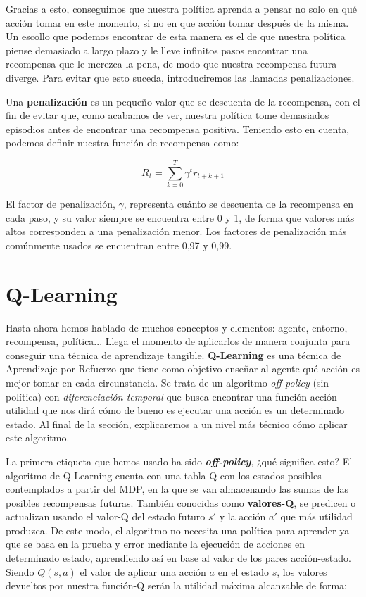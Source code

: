 Gracias a esto, conseguimos que nuestra política aprenda a pensar no solo en qué acción tomar en este momento, si no en que acción tomar después de la misma. Un escollo que podemos encontrar de esta manera es el de que nuestra política piense demasiado a largo plazo y le lleve infinitos pasos encontrar una recompensa que le merezca la pena, de modo que nuestra recompensa futura diverge. Para evitar que esto suceda, introduciremos las llamadas penalizaciones.

Una \textbf{penalización} es un pequeño valor que se descuenta de la recompensa, con el fin de evitar que, como acabamos de ver, nuestra política tome demasiados episodios antes de encontrar una recompensa positiva. Teniendo esto en cuenta, podemos definir nuestra función de recompensa como:

\begin{equation}
    R_{t} = \sum^{T}_{k = 0} \gamma^{t}r_{t + k + 1}
\end{equation}

El factor de penalización, \( \gamma \), representa cuánto se descuenta de la recompensa en cada paso, y su valor siempre se encuentra entre 0 y 1, de forma que valores más altos corresponden a una penalización menor. Los factores de penalización más comúnmente usados se encuentran entre 0,97 y 0,99.


\section{Q-Learning}
Hasta ahora hemos hablado de muchos conceptos y elementos: agente, entorno, recompensa, política... Llega el momento de aplicarlos de manera conjunta para conseguir una técnica de aprendizaje tangible. \textbf{Q-Learning} es una técnica de Aprendizaje por Refuerzo que tiene como objetivo enseñar al agente qué acción es mejor tomar en cada circunstancia. Se trata de un algoritmo \textit{off-policy} (sin política) con \textit{diferenciación temporal} que busca encontrar una función acción-utilidad que nos dirá cómo de bueno es ejecutar una acción es un determinado estado. Al final de la sección, explicaremos a un nivel más técnico cómo aplicar este algoritmo.

La primera etiqueta que hemos usado ha sido \textbf{\textit{off-policy}}, ¿qué significa esto? El algoritmo de Q-Learning cuenta con una tabla-Q con los estados posibles contemplados a partir del MDP, en la que se van almacenando las sumas de las posibles recompensas futuras. También conocidas como \textbf{valores-Q}, se predicen o actualizan usando el valor-Q del estado futuro $s'$ y la acción $a'$ que más utilidad produzca. De este modo, el algoritmo no necesita una política para aprender ya que se basa en la prueba y error mediante la ejecución de acciones en determinado estado, aprendiendo así en base al valor de los pares acción-estado. Siendo $Q(s, a)$ el valor de aplicar una acción $a$ en el estado $s$, los valores devueltos por nuestra función-Q serán la utilidad máxima alcanzable de forma:

